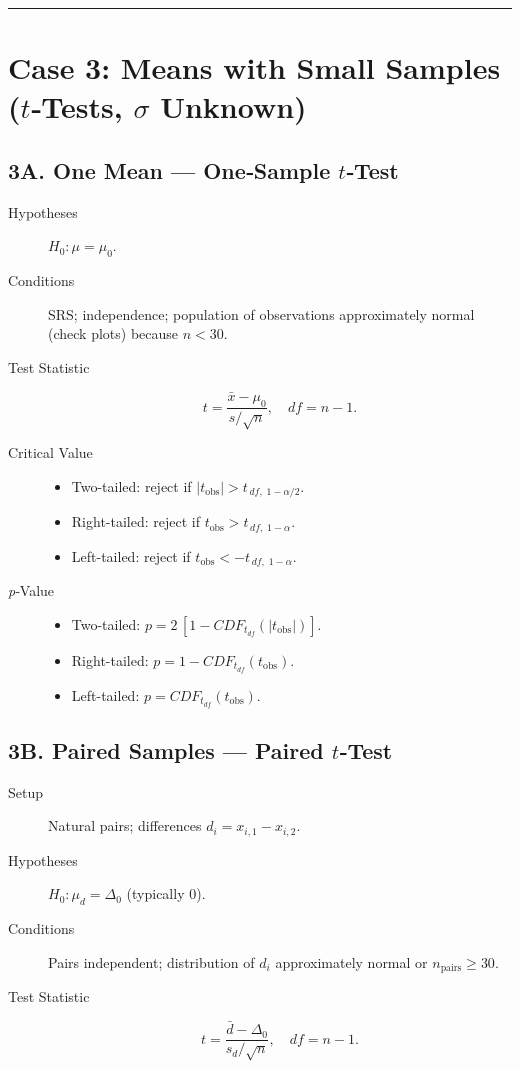 \documentclass[12pt]{article}
\begin{document}
\bigskip\hrule\bigskip

\section*{Case 3: Means with Small Samples ($t$‐Tests, $\sigma$ Unknown)}
\subsection*{3A. One Mean — One‐Sample $t$‐Test}
\begin{description}
    \item[Hypotheses] $H_0\!: \mu=\mu_0$.
    \item[Conditions] SRS; independence; population of observations approximately normal (check plots) because $n<30$.
    \item[Test Statistic] \[ t = \dfrac{\bar x-\mu_0}{s/\sqrt n}, \quad df = n-1. \]
    \item[Critical Value] 
          \begin{itemize}
            \item Two-tailed: reject if $|t_{\text{obs}}| > t_{\,df,\;1-\alpha/2}$.
            \item Right-tailed: reject if $t_{\text{obs}} > t_{\,df,\;1-\alpha}$.
            \item Left-tailed: reject if $t_{\text{obs}} < -t_{\,df,\;1-\alpha}$.
          \end{itemize}
    \item[\emph{p}‐Value]
          \begin{itemize}
            \item Two-tailed: $p = 2\,[1 - CDF_{t_{df}}(|t_{\text{obs}}|)]$.
            \item Right-tailed: $p = 1 - CDF_{t_{df}}(t_{\text{obs}})$.
            \item Left-tailed: $p = CDF_{t_{df}}(t_{\text{obs}})$.
          \end{itemize}
\end{description}

\subsection*{3B. Paired Samples — Paired $t$‐Test}
\begin{description}
  \item[Setup] Natural pairs; differences $d_i=x_{i,1}-x_{i,2}$.
  \item[Hypotheses] $H_0\!: \mu_d=\Delta_0$ (typically 0).
  \item[Conditions] Pairs independent; distribution of $d_i$ approximately normal or $n_{\text{pairs}}\ge30$.
  \item[Test Statistic] \[ t = \dfrac{\bar d-\Delta_0}{s_d/\sqrt n}, \quad df = n-1. \]
\end{description}
\end{document}
